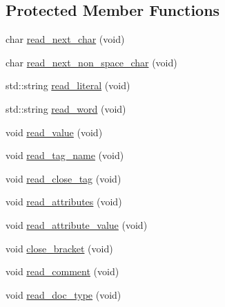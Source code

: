 \subsection*{Protected Member Functions}
\begin{DoxyCompactItemize}
\item 
char \hyperlink{classeternity_1_1xml__scanner_a30953343be7681f13754b7ca239a1731}{read\+\_\+next\+\_\+char} (void)
\item 
char \hyperlink{classeternity_1_1xml__scanner_a2c83fb7bc8a7208e18abde0af1e9f8dd}{read\+\_\+next\+\_\+non\+\_\+space\+\_\+char} (void)
\item 
std\+::string \hyperlink{classeternity_1_1xml__scanner_a036421e922b108f4f5830693ef29f7a1}{read\+\_\+literal} (void)
\item 
std\+::string \hyperlink{classeternity_1_1xml__scanner_a9bfbec818a6e30a441a46ffc34faff52}{read\+\_\+word} (void)
\item 
void \hyperlink{classeternity_1_1xml__scanner_a660fac686fecd6778777d5b3e3ec0f99}{read\+\_\+value} (void)
\item 
void \hyperlink{classeternity_1_1xml__scanner_a7394e05ca6c942057a24dcd2ce227931}{read\+\_\+tag\+\_\+name} (void)
\item 
void \hyperlink{classeternity_1_1xml__scanner_a1e29dfbc46de1741707e9e63dffaee25}{read\+\_\+close\+\_\+tag} (void)
\item 
void \hyperlink{classeternity_1_1xml__scanner_aed55ba6dede7eae6e069a423e2accc4e}{read\+\_\+attributes} (void)
\item 
void \hyperlink{classeternity_1_1xml__scanner_a06510f110112a2b808c9f79136e1c11b}{read\+\_\+attribute\+\_\+value} (void)
\item 
void \hyperlink{classeternity_1_1xml__scanner_a360c38ea21cf8abad35a91e812658edf}{close\+\_\+bracket} (void)
\item 
void \hyperlink{classeternity_1_1xml__scanner_a0f8d1cdba0e72846f8dd9710eedcc7c8}{read\+\_\+comment} (void)
\item 
void \hyperlink{classeternity_1_1xml__scanner_a869bad0bc0339550434cd9b00b517296}{read\+\_\+doc\+\_\+type} (void)
\end{DoxyCompactItemize}
